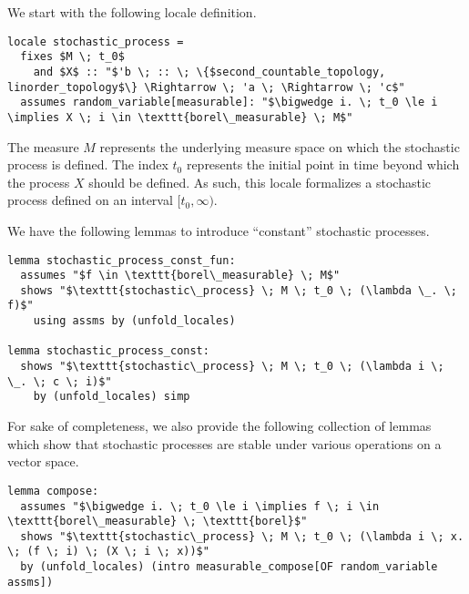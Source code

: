 We start with the following locale definition.

\begin{isadefinition}
{\small
\begin{lstlisting}[style=isabelle]
locale stochastic_process =
  fixes $M \; t_0$ 
	and $X$ :: "$'b \; :: \; \{$second_countable_topology, linorder_topology$\} \Rightarrow \; 'a \; \Rightarrow \; 'c$"
  assumes random_variable[measurable]: "$\bigwedge i. \; t_0 \le i \implies X \; i \in \texttt{borel\_measurable} \; M$"
\end{lstlisting}
}
\end{isadefinition}

The measure $M$ represents the underlying measure space on which the stochastic process is defined. The index $t_0$ represents the initial point in time beyond which the process $X$ should be defined. As such, this locale formalizes a stochastic process defined on an interval $[t_0, \infty)$. 

We have the following lemmas to introduce ``constant'' stochastic processes.

\begin{isalemma}
{\small
\begin{lstlisting}[style=isabelle]
lemma stochastic_process_const_fun:
  assumes "$f \in \texttt{borel\_measurable} \; M$"
  shows "$\texttt{stochastic\_process} \; M \; t_0 \; (\lambda \_. \; f)$"
    using assms by (unfold_locales)

lemma stochastic_process_const:
  shows "$\texttt{stochastic\_process} \; M \; t_0 \; (\lambda i \; \_. \; c \; i)$" 
    by (unfold_locales) simp

\end{lstlisting}
}
\end{isalemma}

For sake of completeness, we also provide the following collection of lemmas which show that stochastic processes are stable under various operations on a vector space.

\begin{isalemma}
{\small
\begin{lstlisting}[style=isabelle]
lemma compose:
  assumes "$\bigwedge i. \; t_0 \le i \implies f \; i \in \texttt{borel\_measurable} \; \texttt{borel}$"
  shows "$\texttt{stochastic\_process} \; M \; t_0 \; (\lambda i \; x. \; (f \; i) \; (X \; i \; x))$"
  by (unfold_locales) (intro measurable_compose[OF random_variable assms])
  \end{lstlisting}
}
\end{isalemma}


